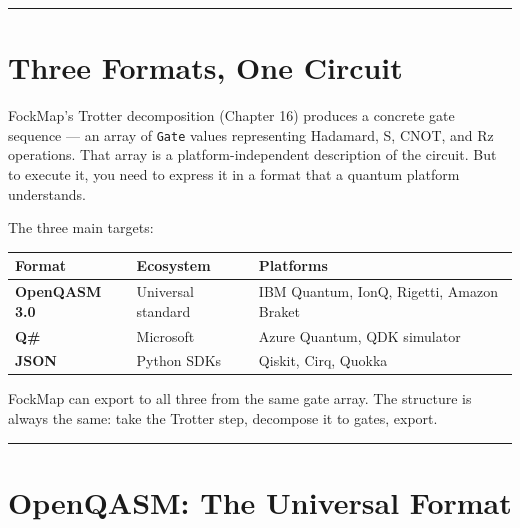\documentclass[
  11pt,
  oneside]{book}
\begin{document}
\begin{center}\rule{0.5\linewidth}{0.5pt}\end{center}

\section{Three Formats, One Circuit}\label{three-formats-one-circuit}

FockMap's Trotter decomposition (Chapter 16) produces a concrete gate
sequence --- an array of \texttt{Gate} values representing Hadamard, S,
CNOT, and Rz operations. That array is a platform-independent
description of the circuit. But to execute it, you need to express it in
a format that a quantum platform understands.

The three main targets:

\begin{longtable}[]{@{}
  >{\raggedright\arraybackslash}p{}
  >{\raggedright\arraybackslash}p{}
  >{\raggedright\arraybackslash}p{}@{}}
\toprule\noalign{}
\begin{minipage}[b]{\linewidth}\raggedright
Format
\end{minipage} & \begin{minipage}[b]{\linewidth}\raggedright
Ecosystem
\end{minipage} & \begin{minipage}[b]{\linewidth}\raggedright
Platforms
\end{minipage} \\
\midrule\noalign{}
\endhead
\bottomrule\noalign{}
\endlastfoot
\textbf{OpenQASM 3.0} & Universal standard & IBM Quantum, IonQ, Rigetti,
Amazon Braket \\
\textbf{Q\#} & Microsoft & Azure Quantum, QDK simulator \\
\textbf{JSON} & Python SDKs & Qiskit, Cirq, Quokka \\
\end{longtable}

FockMap can export to all three from the same gate array. The structure
is always the same: take the Trotter step, decompose it to gates,
export.

\begin{center}\rule{0.5\linewidth}{0.5pt}\end{center}

\section{OpenQASM: The Universal
Format}\label{openqasm-the-universal-format}
\end{document}
